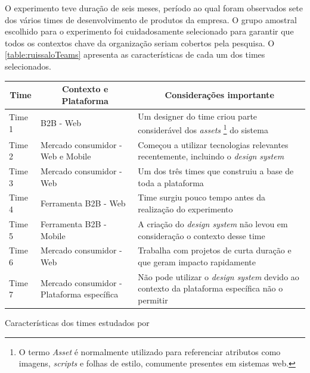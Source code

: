 O experimento teve duração de seis meses, período ao qual foram observados sete dos vários times de desenvolvimento de produtos da empresa. O grupo amostral escolhido para o experimento foi cuidadosamente selecionado para garantir que todos os contextos chave da organização seriam cobertos pela pesquisa. O \autoref{table:ruissaloTeams} apresenta as características de cada um dos times selecionados.

\begin{quadro}
  \centering
  \begin{tabular}{|m{2cm}|m{4cm}|m{8cm}|} \hline
    
    \multicolumn{1}{|c|}{\bfseries Time} & \multicolumn{1}{c|}{\bfseries Contexto e Plataforma} & \multicolumn{1}{c|}{\bfseries Considerações importante} \\\hline
    
     Time 1 & B2B - Web & Um designer do time criou parte considerável dos \textit{assets} \footnote{O termo \textit{Asset} é normalmente utilizado para referenciar atributos como imagens, \textit{scripts} e folhas de estilo, comumente presentes em sistemas web.} do sistema \\\hline
     
     Time 2 & Mercado consumidor - Web e Mobile & Começou a utilizar tecnologias relevantes recentemente, incluindo o \textit{design system} \\\hline
     
     Time 3 & Mercado consumidor - Web & Um dos três times que construiu a base de toda a plataforma \\\hline
     
     Time 4 & Ferramenta B2B - Web & Time surgiu pouco tempo antes da realização do experimento \\\hline
     
     Time 5 & Ferramenta B2B - Mobile & A criação do \textit{design system} não levou em consideração o contexto desse time \\\hline
     
     Time 6 & Mercado consumidor - Web & Trabalha com projetos de curta duração e que geram impacto rapidamente \\\hline
     
     Time 7 & Mercado consumidor - Plataforma específica & Não pode utilizar o \textit{design system} devido ao contexto da plataforma específica não o permitir \\\hline
     
      
  \end{tabular}
  \caption{Características dos times estudados por }
  \label{table:ruissaloTeams}
\end{quadro}

